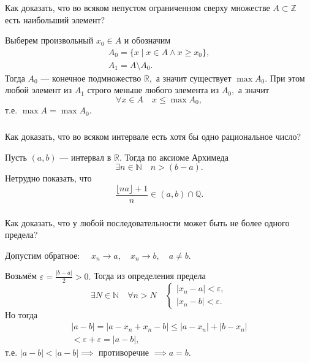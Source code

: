 \documentclass[11pt, a5paper]{article}
\newenvironment{note}[1]{\subsubsection{}}{}
\newenvironment{cloze}[2][\ldots]{\begin{leftbar}}{\end{leftbar}}
\begin{document}
    \begin{note}{02fab2f581504672bc9dc06a5dfa4166}
        Как доказать, что во всяком непустом ограниченном сверху множестве \( A
        \subset \mathbb Z \) есть наибольший элемент?

        \begin{cloze}{1}
            Выберем произвольный \( x_0 \in A \) и обозначим \[
                \begin{gathered}
                    A_0 = \{ x \mid x \in A \land x \geqslant x_0 \},  \\
                    A_1 = A \setminus A_0.
                \end{gathered}
            \]
            Тогда \( A_0 \) --- конечное подмножество \( \mathbb R, \) а значит
            существует \( \max A_0. \) При этом любой элемент из \( A_1 \)
            строго меньше любого элемента из \( A_0,  \) а значит \[
                \forall x \in A \quad x \leqslant \max A_0,
            \]
            т.е. \( \max A = \max A_0. \)
        \end{cloze}
    \end{note}

    \begin{note}{c7dd2e717d9c47199cf723b912cf4e34}
        Как доказать, что во всяком интервале есть хотя бы одно рациональное
        число?

        \begin{cloze}{1}
            Пусть \( (a, b) \) --- интервал в \( \mathbb R. \) Тогда по аксиоме
            Архимеда \[
               \exists n \in \mathbb N \quad n > (b - a).
            \]
            Нетрудно показать, что \[
                \dfrac{\lfloor na \rfloor + 1}{n} \in (a, b) \cap \mathbb Q .
            \]
        \end{cloze}
    \end{note}

    \begin{note}{d8e380894b49477d9b690778e94ae82c}
        Как доказать, что у любой последовательности может быть не более одного
        предела?

        \begin{cloze}{1}
            Допустим обратное: \( \quad x_n \to a, \quad x_n \to b, \quad a \neq b. \)

            Возьмём \( \varepsilon = \frac{|b - a|}{2} > 0. \) Тогда из
            определения предела \[
                \exists N \in \mathbb N \quad \forall n > N \quad
                \begin{cases}
                    |x_n - a| < \varepsilon, \\
                    |x_n - b| < \varepsilon.
                \end{cases}
            \]
            Но тогда
            \begin{multline*}
                |a - b| = |a - x_n + x_n - b| \leqslant |a - x_n| + |b - x_n| \\
                < \varepsilon + \varepsilon = |a - b|,
            \end{multline*}
            т.е. \( |a - b| < |a - b| \implies \) противоречие \( \implies a =
            b. \)
        \end{cloze}
    \end{note}
\end{document}
